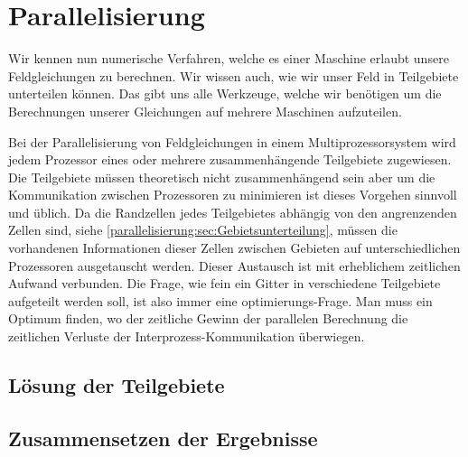 %
%
%
%
\section{Parallelisierung
\label{parallelisierung:sec:Parallelisierung}}
Wir kennen nun numerische Verfahren, welche es einer Maschine erlaubt unsere Feldgleichungen zu berechnen.
Wir wissen auch, wie wir unser Feld in Teilgebiete unterteilen können.
Das gibt uns alle Werkzeuge, welche wir benötigen um die Berechnungen unserer Gleichungen auf mehrere Maschinen aufzuteilen.

Bei der Parallelisierung von Feldgleichungen in einem Multiprozessorsystem wird jedem Prozessor eines oder mehrere zusammenhängende Teilgebiete zugewiesen.
Die Teilgebiete müssen theoretisch nicht zusammenhängend sein aber um die Kommunikation zwischen Prozessoren zu minimieren ist dieses Vorgehen sinnvoll und üblich.
Da die Randzellen jedes Teilgebietes abhängig von den angrenzenden Zellen sind, siehe \ref{parallelisierung:sec:Gebietsunterteilung}, müssen die vorhandenen Informationen dieser Zellen zwischen Gebieten auf unterschiedlichen Prozessoren ausgetauscht werden.
Dieser Austausch ist mit erheblichem zeitlichen Aufwand verbunden.
Die Frage, wie fein ein Gitter in verschiedene Teilgebiete aufgeteilt werden soll, ist also immer eine optimierungs-Frage.
Man muss ein Optimum finden, wo der zeitliche Gewinn der parallelen Berechnung die zeitlichen Verluste der Interprozess-Kommunikation überwiegen.




\subsection{Lösung der Teilgebiete \label{parallelisierung:sub:Teilgebiete}}

\subsection{Zusammensetzen der Ergebnisse \label{parallelisierung:sub:Ergebnisse}}
